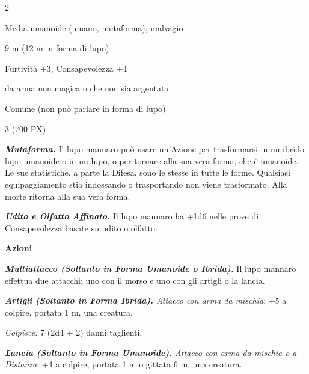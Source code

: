 \begin{multicols}{2}
{
\begin{description}[noitemsep, topsep=0pt, parsep=0pt, partopsep=0pt, itemsep=1pt, leftmargin=2.35cm,  labelwidth=2.2cm, itemindent=0cm, listparindent=0pt] %
\setlength{\baselineskip}{10pt}
\item[\textbf{Taglia/Tipo}] Media umanoide (umano, mutaforma), malvagio
\item[\textbf{Caratt.}] 
\item[\textbf{Punti Ferita}] 
\item[\textbf{Movimento}] 9 m (12 m in forma di lupo)
\item[\textbf{Tiri Salvez.}] 
\item[\textbf{Comp.}] Furtività +3, Consapevolezza +4
\item[\textbf{Imm. Danni}] da arma non magica o che non sia argentata
\item[\textbf{Linguaggi}] Comune (non può parlare in forma di lupo)
\item[\textbf{Sfida}] 3 (700 PX)
\end{description}
\smallskip

\emph{\textbf{Mutaforma.}} Il lupo mannaro può usare un'Azione per trasformarsi in un ibrido lupo-umanoide o in un lupo, o per tornare alla sua vera forma, che è umanoide. Le sue statistiche, a parte la Difesa, sono le stesse in tutte le forme. Qualsiasi equipaggiamento stia indossando o trasportando non viene trasformato. Alla morte ritorna alla sua vera forma.

\emph{\textbf{Udito e Olfatto Affinato.}} Il lupo mannaro ha +1d6 nelle prove di Consapevolezza basate su udito o olfatto.

\textbf{Azioni}

\emph{\textbf{Multiattacco (Soltanto in Forma Umanoide o Ibrida).}} Il lupo mannaro effettua due attacchi: uno con il morso e uno con gli artigli o la lancia.

\emph{\textbf{Artigli (Soltanto in Forma Ibrida).} Attacco con arma da mischia}: +5 a colpire, portata 1 m, una creatura.

\emph{Colpisce:} 7 (2d4 + 2) danni taglienti.

\emph{\textbf{Lancia (Soltanto in Forma Umanoide).} Attacco con arma da mischia o a Distanza}: +4 a colpire, portata 1 m o gittata 6 m, una creatura.

}
\end{multicols}
